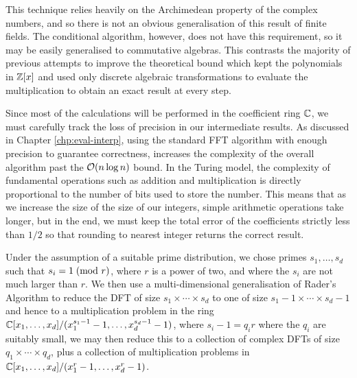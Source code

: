 This technique relies heavily on the Archimedean property of the complex numbers, and so there is not an obvious generalisation of this result of finite fields. The conditional algorithm, however, does not have this requirement, so it may be easily generalised to commutative algebras. This contrasts the majority of previous attempts to improve the theoretical bound which kept the polynomials in ${\mathbb Z}[x]$ and used only discrete algebraic transformations to evaluate the multiplication to obtain an exact result at every step.

Since most of the calculations will be performed in the coefficient ring ${\mathbb C}$, we must carefully track the loss of precision in our intermediate results. As discussed in Chapter \ref{chp:eval-interp}, using the standard FFT algorithm with enough precision to guarantee correctness, increases the complexity of the overall algorithm past the $\mathcal O(n \log n)$ bound. In the Turing model, the complexity of fundamental operations such as addition and multiplication is directly proportional to the number of bits used to store the number. This means that as we increase the size of the size of our integers, simple arithmetic operations take longer, but in the end, we must keep the total error of the coefficients strictly less than $1/2$ so that rounding to nearest integer returns the correct result. 



Under the assumption of a suitable prime distribution, we chose primes $s_1, \ldots, s_d$ such that $s_i = 1 \;(\textrm{mod } r)$, where $r$ is a power of two, and where the $s_i$ are not much larger than $r$. We then use a multi-dimensional generalisation of Rader's Algorithm to reduce the DFT of size $s_1 \times \cdots \times s_d$ to one of size $s_1-1 \times \cdots \times s_d-1$ and hence to a multiplication problem in the ring ${\mathbb C}[x_1, \ldots, x_d] / (x_1^{s_1 - 1} - 1, \ldots, x_d^{s_d - 1} - 1)$, where $s_i - 1 = q_i r$ where the $q_i$ are suitably small, we may then reduce this to a collection of complex DFTs of size $q_1 \times \cdots \times q_d$, plus a collection of multiplication problems in ${\mathbb C}[x_1, \ldots, x_d] / (x_1^r - 1, \ldots, x_d^r - 1)$. \\


